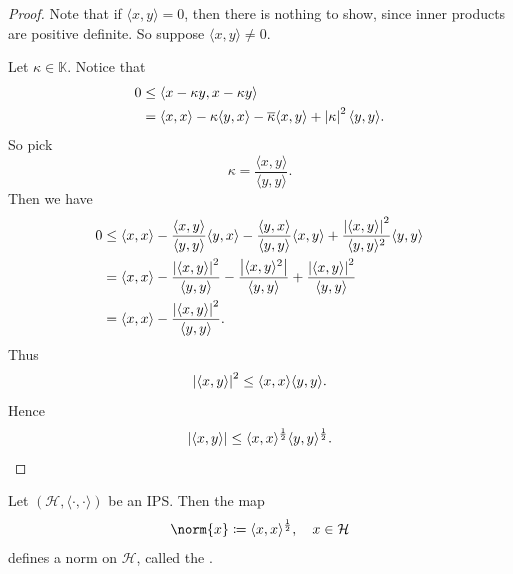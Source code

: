 \documentclass[notoc,notitlepage]{tufte-book}
\begin{document}
\begin{proof}
  Note that if $\langle x, y \rangle = 0$, then there is nothing to show,
  since inner products are positive definite.
  So suppose $\langle x, y \rangle \neq 0$.

  Let $\kappa \in \mathbb{K}$. Notice that
  \begin{align*}
    0 &\leq \langle x - \kappa y, x - \kappa y \rangle \\
      &= \langle x, x \rangle - \kappa \langle y, x \rangle
        - \overline{\kappa} \langle x, y \rangle
        + \left|\kappa\right|^2 \langle y, y \rangle.
  \end{align*}
  So pick
  \begin{equation*}
    \kappa = \frac{\langle x, y \rangle}{\langle y, y \rangle}.
  \end{equation*}
  Then we have
  \begin{align*}
    0 &\leq \langle x, x \rangle
        - \frac{\langle x, y \rangle}{\langle y, y \rangle} \langle y, x \rangle
        - \frac{\langle y, x \rangle}{\langle y, y \rangle} \langle x, y \rangle
        + \frac{\left|\langle x, y \rangle\right|^2}{\langle y, y \rangle^2} \langle y, y \rangle \\
      &= \langle x, x \rangle
        - \frac{\left|\langle x, y \rangle\right|^2}{\langle y, y \rangle}
        - \frac{\left|\langle x, y \rangle^2\right|}{\langle y, y \rangle}
        + \frac{\left|\langle x, y \rangle\right|^2}{\langle y, y \rangle} \\
      &= \langle x, x \rangle
        - \frac{\left|\langle x, y \rangle\right|^2}{\langle y, y \rangle}.
  \end{align*}
  Thus
  \begin{equation*}
    \left|\langle x, y \rangle\right|^2 \leq \langle x, x \rangle \langle y, y \rangle.
  \end{equation*}
  Hence
  \begin{equation*}
    \left|\langle x, y \rangle\right|
    \leq \langle x, x \rangle^{\frac{1}{2}} \langle y, y \rangle^{\frac{1}{2}}.
  \end{equation*}
\end{proof}

\begin{propo}\label{propo:norm_induced_by_the_inner_product}
  Let $(\mathcal{H}, \langle \cdot, \cdot \rangle)$ be an IPS.
  Then the map
  \begin{equation*}
    \norm{x} \coloneqq \langle x, x \rangle^{\frac{1}{2}},\quad
    x \in \mathcal{H}
  \end{equation*}
  defines a norm on $\mathcal{H}$,
  called the .
\end{propo}
\end{document}
